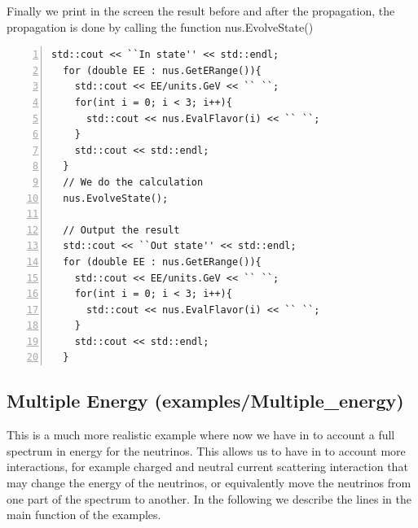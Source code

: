 Finally we print in the screen the result before and after the
propagation, the propagation is done by calling the function  {\ttf
  nus.EvolveState()} 
\begin{lstlisting}[frame=leftline, numbers = left,breaklines=true, label = ex:sin1,firstnumber=last]
  std::cout << ``In state'' << std::endl;
  for (double EE : nus.GetERange()){
    std::cout << EE/units.GeV << `` ``;
    for(int i = 0; i < 3; i++){
      std::cout << nus.EvalFlavor(i) << `` ``;
    }
    std::cout << std::endl;
  }
  // We do the calculation                                                                                  
  nus.EvolveState();
  
  // Output the result                                                                                 
  std::cout << ``Out state'' << std::endl;
  for (double EE : nus.GetERange()){
    std::cout << EE/units.GeV << `` ``;
    for(int i = 0; i < 3; i++){
      std::cout << nus.EvalFlavor(i) << `` ``;
    }
    std::cout << std::endl;
  }
\end{lstlisting}


\subsection{Multiple Energy \textnormal{({\ttf examples/Multiple\_energy})}}
This is a much more realistic example where now we have in to account
a full spectrum in energy for the neutrinos. This allows us to have in
to account more interactions, for example charged and neutral current
scattering interaction that may change the energy of the neutrinos, or
equivalently move the neutrinos from one part of the spectrum to
another. In the following we describe the lines in the main function
of the examples.


